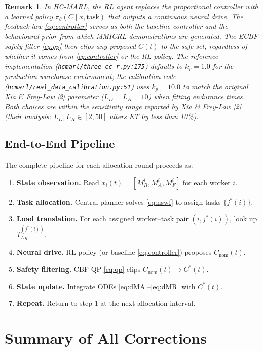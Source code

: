 \documentclass[11pt,a4paper]{article}
\newtheorem{remark}[theorem]{Remark}
\begin{document}
\begin{remark}
In HC-MARL, the RL agent replaces the proportional controller with a
learned policy $\pi_\theta(C \mid x, \text{task})$ that outputs a
continuous neural drive. The feedback law \eqref{eq:controller} serves
as both the baseline controller and the behavioural prior from which
MMICRL demonstrations are generated. The ECBF safety filter
\eqref{eq:qp} then clips any proposed $C(t)$ to the safe set,
regardless of whether it comes from \eqref{eq:controller} or the RL
policy. The reference implementation
(\texttt{hcmarl/three\_cc\_r.py:175}) defaults to $k_p = 1.0$ for the
production warehouse environment; the calibration code
(\texttt{hcmarl/real\_data\_calibration.py:51}) uses $k_p = 10.0$ to
match the original Xia \& Frey-Law [2] parameter ($L_D = L_R = 10$)
when fitting endurance times. Both choices are within the
sensitivity range reported by Xia \& Frey-Law [2] (their analysis:
$L_D, L_R \in [2, 50]$ alters ET by less than 10\%).
\end{remark}

\subsection{End-to-End Pipeline}

The complete pipeline for each allocation round proceeds as:
\begin{enumerate}[noitemsep]
\item \textbf{State observation.} Read $x_i(t) = [M_R^i, M_A^i, M_F^i]$ for each worker $i$.
\item \textbf{Task allocation.} Central planner solves \eqref{eq:nswf} to assign tasks $\{j^*(i)\}$.
\item \textbf{Load translation.} For each assigned worker--task pair $(i, j^*(i))$, look up $T^{(j^*(i))}_{L\,g}$.
\item \textbf{Neural drive.} RL policy (or baseline \eqref{eq:controller}) proposes $C_{\mathrm{nom}}(t)$.
\item \textbf{Safety filtering.} CBF-QP \eqref{eq:qp} clips $C_{\mathrm{nom}}(t) \to C^*(t)$.
\item \textbf{State update.} Integrate ODEs \eqref{eq:dMA}--\eqref{eq:dMR} with $C^*(t)$.
\item \textbf{Repeat.} Return to step 1 at the next allocation interval.
\end{enumerate}

\section{Summary of All Corrections}
\end{document}
